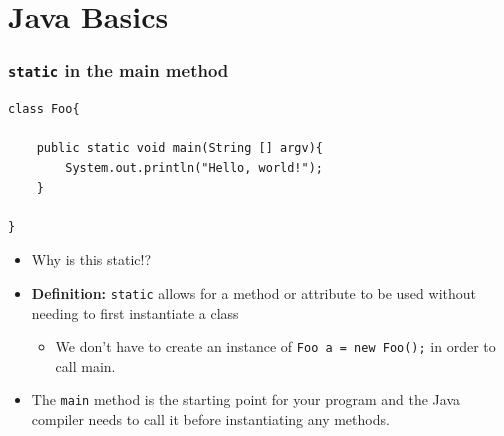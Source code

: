 \documentclass{beamer}
\begin{document}
\begin{frame}
\begin{minipage}{0.59\textwidth}
\begin{minipage}{0.49\textwidth}
    \end{minipage}
  \end{minipage}
\end{frame}
\section{Java Basics}

\begin{frame}[fragile]
    \frametitle{\lstinline|static| in the main method}
    \begin{lstlisting}[frame=trBL]
class Foo{

    public static void main(String [] argv){
        System.out.println("Hello, world!");
    }

}
    \end{lstlisting}
    \vfill
    \begin{itemize}
        \item Why is this static!?
            \pause
        \item \textbf{Definition: } \lstinline|static| allows for a method or attribute to be used without needing to first instantiate a class
            \begin{itemize}
                \item We don't have to create an instance of \lstinline|Foo a = new Foo();| in order to call main.
            \end{itemize}
            \pause
        \item The \lstinline|main| method is the starting point for your program and the Java compiler needs to call it before instantiating any methods.
    \end{itemize}
\end{frame}
\end{document}
